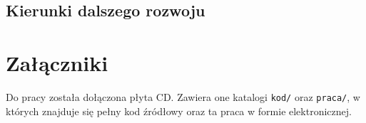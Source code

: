 \documentclass[a4paper,onecolumn,oneside,11pt,wide,floatssmall]{mwrep}
\theoremstyle{definition}
\theoremstyle{plain}%
\theoremstyle{remark}
\begin{document}
\section{Kierunki dalszego rozwoju}

\appendix

\chapter{Załączniki}

Do pracy została dołączona płyta CD. Zawiera one katalogi \texttt{kod/} oraz \texttt{praca/},
w których znajduje się pełny kod źródłowy oraz ta praca w formie elektronicznej.

\nocite{*}


\end{document}
